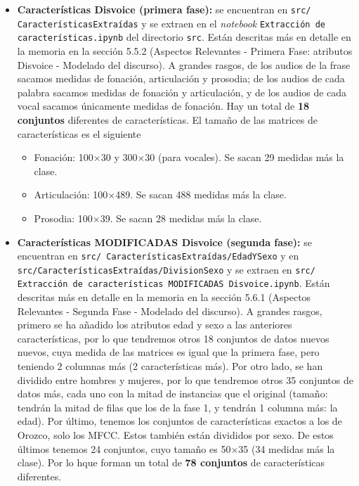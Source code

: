 \begin{itemize}
\item \textbf{Características Disvoice (primera fase):} se encuentran en \texttt{src/ CaracterísticasExtraídas} y se extraen en el \textit{notebook} \texttt{Extracción de características.ipynb} del directorio \texttt{src}. Están descritas más en detalle en la memoria en la sección 5.5.2 (Aspectos Relevantes - Primera Fase: atributos Disvoice - Modelado del discurso). A grandes rasgos, de los audios de la frase sacamos medidas de fonación, articulación y prosodia; de los audios de cada palabra sacamos medidas de fonación y articulación, y de los audios de cada vocal sacamos únicamente medidas de fonación. Hay un total de \textbf{18 conjuntos} diferentes de características. El tamaño de las matrices de características es el siguiente
	\begin{itemize}
	\item Fonación: 100$\times$30 y 300$\times$30 (para vocales). Se sacan 29 medidas más la clase. 
	\item Articulación: 100$\times$489. Se sacan 488 medidas más la clase.
	\item Prosodia: 100$\times$39. Se sacan 28 medidas más la clase.
	\end{itemize}

\item \textbf{Características MODIFICADAS Disvoice (segunda fase):} se encuentran en \texttt{src/ CaracterísticasExtraídas/EdadYSexo} y en \texttt{src/CaracterísticasExtraídas/DivisionSexo} y se extraen en \texttt{src/ Extracción de características MODIFICADAS Disvoice.ipynb}. Están descritas más en detalle en la memoria en la sección 5.6.1 (Aspectos Relevantes - Segunda Fase - Modelado del discurso). A grandes rasgos, primero se ha añadido los atributos edad y sexo a las anteriores características, por lo que tendremos otros 18 conjuntos de datos nuevos nuevos, cuya medida de las matrices es igual que la primera fase, pero teniendo 2 columnas más (2 características más). Por otro lado, se han dividido entre hombres y mujeres, por lo que tendremos otros 35 conjuntos de datos más, cada uno con la mitad de instancias que el original (tamaño: tendrán la mitad de filas que los de la fase 1, y tendrán 1 columna más: la edad). Por último, tenemos los conjuntos de características exactos a los de Orozco, solo los MFCC. Estos también están divididos por sexo. De estos últimos tenemos 24 conjuntos, cuyo tamaño es 50$\times$35 (34 medidas más la clase). Por lo hque forman un total de \textbf{78 conjuntos} de características diferentes.


\end{itemize}
